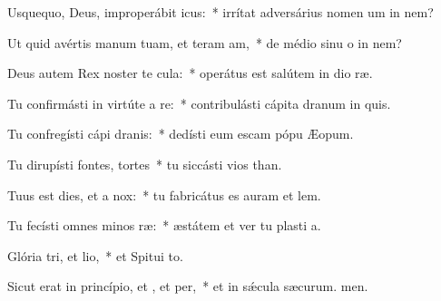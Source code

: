 \item Usquequo, Deus, improperábit icus:~* irrítat adversárius nomen um in nem?
\item Ut quid avértis manum tuam, et teram am,~* de médio sinu o in nem?
\item Deus autem Rex noster te cula:~* operátus est salútem in dio ræ.
\item Tu confirmásti in virtúte a re:~* contribulásti cápita dranum in quis.
\item Tu confregísti cápi dranis:~* dedísti eum escam pópu Æopum.
\item Tu dirupísti fontes,  tortes~* tu siccásti vios than.
\item Tuus est dies, et a  nox:~* tu fabricátus es auram et lem.
\item Tu fecísti omnes minos ræ:~* æstátem et ver tu plasti a.
\item Glória tri, et lio,~* et Spitui to.
\item Sicut erat in princípio, et , et per,~* et in sǽcula sæcurum. men.
